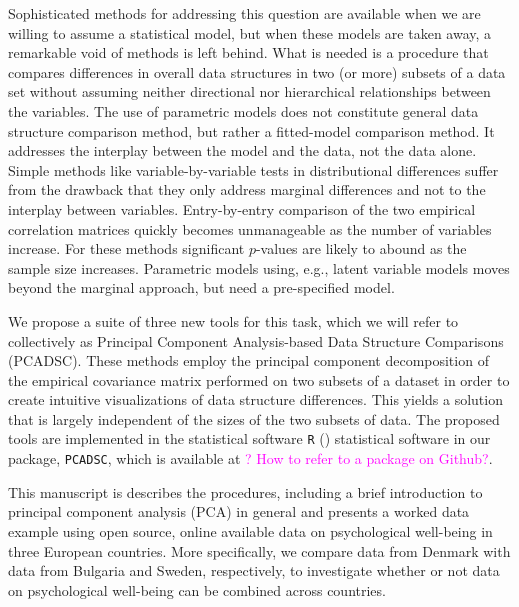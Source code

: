 \documentclass[titlepage,11pt,twoside]{article}
\newcommand{\hl}[1]{\textcolor{magenta}{#1}}
\begin{document}
Sophisticated methods for addressing this question are available when we are willing to assume a statistical model, but when these models are taken away, a remarkable void of methods is left behind. What is needed is a procedure that compares differences in overall data structures in two (or more) subsets of a data set without assuming neither directional nor hierarchical relationships between the variables. The use of parametric models does not constitute general data structure comparison method, but rather a fitted-model comparison method. It addresses the interplay between the model and the data, not the data alone. Simple methods like variable-by-variable tests in distributional differences suffer from the drawback that they only address marginal differences and not to the interplay between variables. Entry-by-entry comparison of the two empirical correlation matrices quickly becomes unmanageable as the number of variables increase. For these methods significant $p$-values are likely to abound as the sample size increases. Parametric models using, e.g., latent variable models moves beyond the marginal approach, but need a pre-specified model.

We propose a suite of three new tools for this task, which we will refer to collectively as Principal Component Analysis-based Data Structure Comparisons (PCADSC). These methods employ the principal component decomposition of the empirical covariance matrix performed on two subsets of a dataset in order to create intuitive visualizations of data structure differences. This yields a solution that is largely independent of the sizes of the two subsets of data. The proposed tools are implemented in the statistical software \texttt{R} (\cite{R}) statistical software in our package, \texttt{PCADSC}, which is available at \hl{? How to refer to a package on Github?}.

This manuscript is describes the procedures, including a brief introduction to principal component analysis (PCA) in general and presents a worked data example using open source, online available data on psychological well-being in three European countries. More specifically, we compare data from Denmark with data from Bulgaria and Sweden, respectively, to investigate whether or not data on psychological well-being can be combined across countries.
\end{document}
